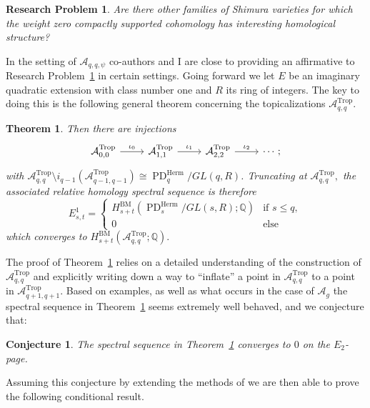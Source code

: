 \documentclass[11pt,reqno]{amsart}
\newtheorem{theorem}[lemma]{Theorem}
\newtheorem{problem}[lemma]{Research Problem}
\newtheorem{conj}[lemma]{Conjecture}
\theoremstyle{remark}
\newcommand{\GL}{{GL}}
\newcommand{\QQ}{\mathbb{Q}}
\newcommand{\cA}{\mathcal{A}}
\DeclareMathOperator{\Trop}{Trop}
\DeclareMathOperator{\PD}{PD}
\begin{document}
\begin{problem}\label{rp:inflation}
Are there other families of Shimura varieties for which the weight zero compactly supported cohomology has interesting homological structure?
\end{problem}

In the setting of $\cA_{q,q,\psi}$ co-authors and I are close to providing an affirmative to Research Problem~\ref{rp:inflation} in certain settings. Going forward we let $E$ be an imaginary quadratic extension with class number one and $R$ its ring of integers. The key to doing this is the following general theorem concerning the topicalizations  $\cA_{q,q}^{\Trop}$. 

\begin{theorem}\label{thm:inflation-A-case} 
Then there are injections
\[
\begin{tikzcd}
\cA_{0,0}^{\Trop} \arrow[r, "\iota_{0}"] & \cA_{1,1}^{\Trop} \arrow[r, "\iota_{1}"] &\cA_{2,2}^{\Trop} \arrow[r, "\iota_{2}"] &\cdots;
\end{tikzcd}
\]
with $\cA_{q,q}^{\Trop} \setminus i_{q-1}(\cA_{q-1,q-1}^{\Trop}) \cong \PD^\mathrm{Herm}_q/\GL(q,R)$.  Truncating at $\cA_{q,q}^{\Trop},$ the associated relative homology spectral sequence is therefore
\[E^1_{s,t} = \begin{cases} H^{\mathrm{BM}}_{s+t} (\PD^\mathrm{Herm}_s/\GL(s,R);\QQ) & \text{if }s \le q,\\ 0 & \text{else}\end{cases}\]
which converges to $H_{s+t}^{\mathrm{BM}} (\cA_{q,q}^{\Trop};\QQ).$
\end{theorem}

The proof of Theorem~\ref{thm:inflation-A-case} relies on a detailed understanding of the construction of $\cA_{q,q}^{\Trop}$ and explicitly writing down a way to ``inflate'' a point in  $\cA_{q,q}^{\Trop}$ to a point in $\cA_{q+1,q+1}^{\Trop}$. Based on examples, as well as what occurs in the case of $\cA_{g}$ the spectral sequence in Theorem~\ref{thm:inflation-A-case} seems extremely well behaved, and we conjecture that:

\begin{conj}\label{con:inflation-A-case}
The spectral sequence in Theorem~\ref{thm:inflation-A-case} converges to $0$ on the $E_2$-page.
\end{conj}

Assuming this conjecture by extending the methods of \cite{BCGP24} we are then able to prove the following conditional result. 
\end{document}
